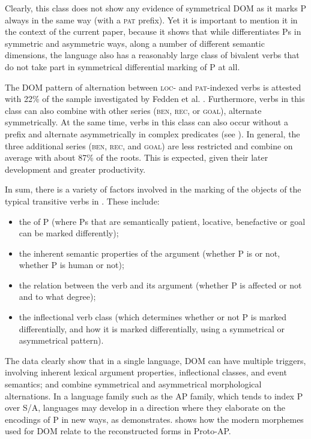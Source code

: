 \documentclass[output=paper]{LSP/langsci}
\begin{document}
 
Clearly, this class does not show any evidence of symmetrical DOM as it marks P always in the same way (with a \textsc{pat} prefix). Yet it is important to mention it in the context of the current paper, because it shows that while  differentiates Ps in symmetric and asymmetric ways, along a number of different semantic dimensions, the language also has a reasonably large class of bivalent verbs that do not take part in symmetrical differential marking of P at all.

The DOM pattern of alternation between \textsc{loc}- and \textsc{pat}-indexed verbs is attested with  22\% of the sample investigated by Fedden et al. \citeyear{Feddenetal2013Feddenetal,Feddenetal2014Variation}. Furthermore, verbs in this class can also combine with other series (\textsc{ben}, \textsc{rec}, or \textsc{goal}), \ie alternate symmetrically. At the same time, verbs in this class can also occur without a prefix and alternate asymmetrically in complex predicates (see \citealt[Table~5]{Feddenetal2014Variation}). In general, the three additional series (\textsc{ben}, \textsc{rec}, and \textsc{goal}) are less restricted and combine on average with about 87\% of the roots. This is expected, given their later development and greater productivity.

In sum, there is a variety of factors involved in the marking of the objects of the typical transitive verbs in . These include: 

\begin{itemize}
\item the  of P (where Ps that are semantically patient, locative, benefactive or goal can be marked differently); 
\item the inherent semantic properties of the argument (whether P is  or not, whether P is human or not);
\item the relation between the verb and its argument (whether P is affected or not and to what degree); 
\item the inflectional verb class (which determines whether or not P is marked differentially, and how it is marked differentially, \ie using a symmetrical or asymmetrical pattern).
\end{itemize}

The  data clearly show that in a single language, DOM can have multiple triggers, involving inherent lexical argument properties, inflectional classes, and event semantics; and combine symmetrical and asymmetrical morphological alternations. In a language family such as the AP family, which tends to index P over S/A, languages may develop in a direction where they elaborate on the encodings of P in new ways, as  demonstrates.  shows how the modern  morphemes used for DOM relate to the reconstructed forms in Proto-AP.
\end{document}

